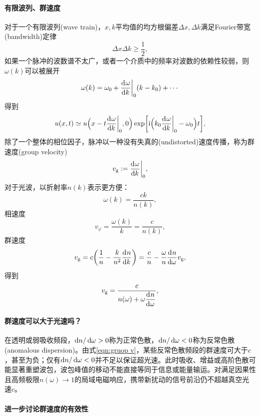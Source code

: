 \paragraph{有限波列、群速度}

对于一个有限波列(wave train)，$x,k$平均值的均方根偏差$\Delta x,\Delta k$满足Fourier带宽(bandwidth)定律
\begin{equation}
    \Delta x\Delta k \geqslant \frac12,
\end{equation}
如果一个脉冲的波数谱不太广，或者一个介质中的频率对波数的依赖性较弱，则$\omega(k)$可以被展开
\[
    \omega(k) = \omega_0 + {\frac{\mathop{}\!\mathrm{d}^{}\omega}{\mathrm{d}{k}^{}}}\biggr\rvert_0(k - k_0) + \cdots
\]
得到 
\[
    u(x,t) \simeq u\Bigl(x - t{\frac{\mathop{}\!\mathrm{d}^{}\omega}{\mathrm{d}{k}^{}}}\biggr\rvert_0,0\Bigr)\exp\biggl[\mathrm{i}\Bigl(k_0{\frac{\mathop{}\!\mathrm{d}^{}\omega}{\mathrm{d}{k}^{}}}\biggr\rvert_0 - \omega_0\Bigr)t\biggr],
\]
除了一个整体的相位因子，脉冲以一种没有失真的(undistorted)速度传播，称为群速度(group velocity)
\begin{equation}
    v_{\mathrm{g}} := {\frac{\mathop{}\!\mathrm{d}^{}\omega}{\mathrm{d}{k}^{}}}\biggr\rvert_0,
\end{equation}
对于光波，以折射率$n(k)$表示更方便：
\[
    \omega(k) = \frac{ck}{n(k)},
\]
相速度
\begin{equation}
    \label{eq:ed-phase-velocity-isotropic}
    v_\varphi = \frac{\omega(k)}k = \frac c{n(k)},
\end{equation}
群速度
\begin{equation}
    \label{eq:ed-group-velocity-isotropic}
    v_{\mathrm{g}} = c\biggl(\frac1n - \frac k{n^2}\frac{\mathop{}\!\mathrm{d}^{}n}{\mathrm{d}{k}^{}}\biggr) = \frac cn - \frac\omega n\frac{\mathop{}\!\mathrm{d}^{}n}{\mathrm{d}{\omega}^{}} v_{\mathrm{g}},
\end{equation}
得到 
\begin{equation}
    \label{eqn:gruop v}
    v_{\mathrm{g}} = \frac c{\displaystyle n(\omega) + \omega\frac{\mathop{}\!\mathrm{d}^{}n}{\mathrm{d}{\omega}^{}}},
\end{equation}

\paragraph{群速度可以大于光速吗？}

在透明或弱吸收频段，$\mathop{}\!\mathrm{d} n/\mathop{}\!\mathrm{d}\omega > 0$称为正常色散，$\mathop{}\!\mathrm{d} n/\mathop{}\!\mathrm{d}\omega < 0$称为反常色散(anomalous dispersion)。由式\eqref{eqn:gruop v}，某些反常色散频段的群速度可大于$c$，甚至为负；仅有$\mathop{}\!\mathrm{d} n/\mathop{}\!\mathrm{d}\omega < 0$并不足以保证超光速。此时吸收、增益或高阶色散可能显著重塑波包，波包峰值的移动不能直接等同于信息或能量输运。对满足因果性且高频极限$n(\omega) \to 1$的局域电磁响应，携带新扰动的信号前沿仍不超越真空光速$c$。

\paragraph{进一步讨论群速度的有效性}

